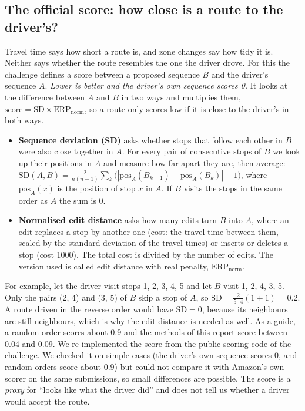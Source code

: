 \documentclass[11pt,a4paper]{article}
\begin{document}
\subsection{The official score: how close is a route to the driver's?}
Travel time says how short a route is, and zone changes say how tidy it is. Neither says whether the route resembles the one the driver drove. For this the challenge defines a score between a proposed sequence $B$ and the driver's sequence $A$. \emph{Lower is better and the driver's own sequence scores 0.} It looks at the difference between $A$ and $B$ in two ways and multiplies them, $\mathrm{score}=\mathrm{SD}\times\mathrm{ERP}_{\mathrm{norm}}$, so a route only scores low if it is close to the driver's in both ways.
\begin{itemize}
\item \textbf{Sequence deviation (SD)} asks whether stops that follow each other in $B$ were also close together in $A$. For every pair of consecutive stops of $B$ we look up their positions in $A$ and measure how far apart they are, then average:
$\mathrm{SD}(A,B)=\frac{2}{n(n-1)}\sum_{k}\bigl(|\mathrm{pos}_A(B_{k+1})-\mathrm{pos}_A(B_k)|-1\bigr)$, where $\mathrm{pos}_A(x)$ is the position of stop $x$ in $A$. If $B$ visits the stops in the same order as $A$ the sum is 0.
\item \textbf{Normalised edit distance} asks how many edits turn $B$ into $A$, where an edit replaces a stop by another one (cost: the travel time between them, scaled by the standard deviation of the travel times) or inserts or deletes a stop (cost 1000). The total cost is divided by the number of edits. The version used is called edit distance with real penalty, $\mathrm{ERP}_{\mathrm{norm}}$.
\end{itemize}
For example, let the driver visit stops 1, 2, 3, 4, 5 and let $B$ visit 1, 2, 4, 3, 5. Only the pairs (2, 4) and (3, 5) of $B$ skip a stop of $A$, so $\mathrm{SD}=\frac{2}{5\cdot4}(1+1)=0.2$. A route driven in the reverse order would have $\mathrm{SD}=0$, because its neighbours are still neighbours, which is why the edit distance is needed as well. As a guide, a random order scores about 0.9 and the methods of this report score between 0.04 and 0.09. We re-implemented the score from the public scoring code of the challenge. We checked it on simple cases (the driver's own sequence scores 0, and random orders score about 0.9) but could not compare it with Amazon's own scorer on the same submissions, so small differences are possible. The score is a \emph{proxy} for ``looks like what the driver did'' and does not tell us whether a driver would accept the route.
\end{document}
